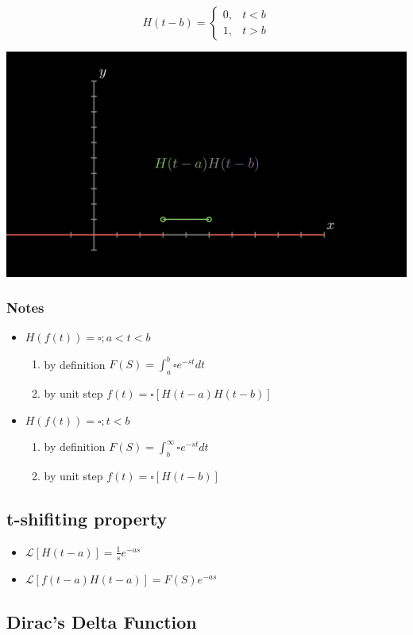 \documentclass[11pt]{article}
\theoremstyle{definition}
\newcommand{\bb}{\mathcal{L}}
\begin{document}
\[   
    H(t- b) = 
    \begin{cases}
        0, & \text{$t < b$} \\ 
        1, & \text{$t > b$}
    \end{cases}
\]

\begin{center}
    \includegraphics[scale=0.15]{Test3.png}
\end{center}

\subsubsection{Notes}
\begin{itemize}
    \item $H(f(t)) = \square; a< t < b$ 
        \begin{enumerate}
            \item by definition $F(S) = \int_a^b\square e^{-st} dt$
            \item by unit step $f(t) = \square[H(t-a)H(t-b)]$   
        \end{enumerate}

    \item $H(f(t)) = \square; t < b$ 
        \begin{enumerate}
            \item by definition $F(S) = \int_b^\infty \square e^{-st} dt$
            \item by unit step $f(t) = \square[H(t-b)]$   
        \end{enumerate}
\end{itemize}
\subsection{t-shifiting property}
\begin{itemize}
        \item $\bb[H(t-a)] = \frac{1}{s}e^{-as}$
        \item $\bb[f(t-a)H(t-a)]= F(S)e^{-as}$
\end{itemize}
\subsection{Dirac's Delta Function}
\end{document}
